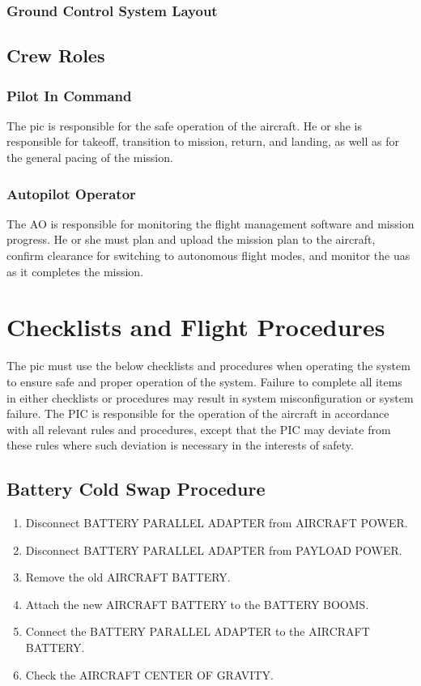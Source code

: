 \documentclass{report}
\begin{document}
		\subsection{Ground Control System Layout}
	\section{Crew Roles}
		\subsection{Pilot In Command}
			The \gls{pic} is responsible for the safe operation of the aircraft.  He or she is responsible for takeoff, transition to mission, return, and landing, as well as for the general pacing of the mission.
		\subsection{Autopilot Operator}
			The \gls{AO} is responsible for monitoring the flight management software and mission progress.  He or she must plan and upload the mission plan to the aircraft, confirm clearance for switching to autonomous flight modes, and monitor the \gls{uas} as it completes the mission.
\chapter{Checklists and Flight Procedures}
	The \gls{pic} must use the below checklists and procedures when operating the system to ensure safe and proper operation of the system.  Failure to complete all items in either checklists or procedures may result in system misconfiguration or system failure.  The PIC is responsible for the operation of the aircraft in accordance with all relevant rules and procedures, except that the PIC may deviate from these rules where such deviation is necessary in the interests of safety.
	\section{Battery Cold Swap Procedure}
		\begin{enumerate}
			\item Disconnect BATTERY PARALLEL ADAPTER from AIRCRAFT POWER.
			\item Disconnect BATTERY PARALLEL ADAPTER from PAYLOAD POWER.
			\item Remove the old AIRCRAFT BATTERY.
			\item Attach the new AIRCRAFT BATTERY to the BATTERY BOOMS.
			\item Connect the BATTERY PARALLEL ADAPTER to the AIRCRAFT BATTERY.
			\item Check the AIRCRAFT CENTER OF GRAVITY.
		\end{enumerate}
\end{document}
